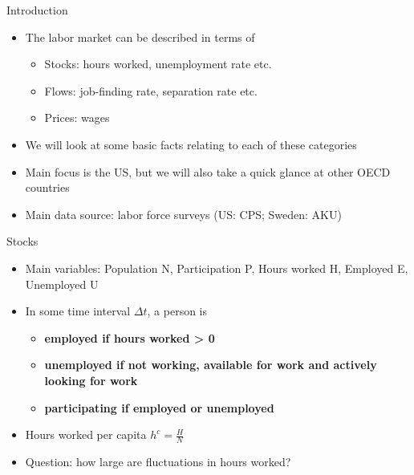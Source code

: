 \documentclass[9pt]{beamer}
\newcommand{\bit}{\begin{itemize}}
\newcommand{\eit}{\end{itemize}}
\begin{document}
\begin{frame}{Introduction}

\bit
\setlength\itemsep{2em}

\item The labor market can be described in terms of
\bit
	\setlength\itemsep{0.5em}
	\item Stocks: hours worked, unemployment rate etc.
	
	\item Flows: job-finding rate, separation rate etc.
	
	\item Prices: wages
\eit

\item We will look at some basic facts relating to each of these categories

\item Main focus is the US, but we will also take a quick glance at other OECD countries

\item Main data source: labor force surveys (US: CPS; Sweden: AKU)

\eit

\end{frame}

\begin{frame}{Stocks}

\bit
\setlength\itemsep{2em}

\item Main variables: Population N, Participation P, Hours worked H, Employed E, Unemployed U

\item In some time interval $\Delta t$, a person is
\bit
\setlength\itemsep{0.5em}
\item \bf employed \normalfont if hours worked > 0
\item \bf unemployed \normalfont if not working, available for work and actively looking for work
\item \bf participating \normalfont if employed or unemployed
\eit 

\item Hours worked per capita $h^c = \frac{H}{N}$

\item Question: how large are fluctuations in hours worked?

\eit

\end{frame}
\end{document}
